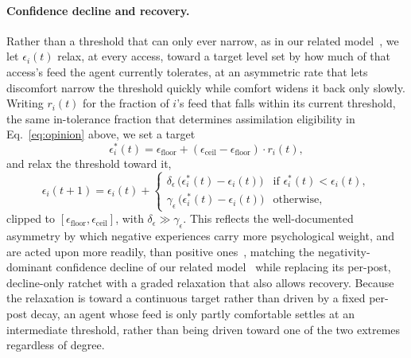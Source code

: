 \documentclass{svproc}
\begin{document}
\paragraph{Confidence decline and recovery.} Rather than a threshold that can only ever narrow, as in our related model~\cite{takeda2026backfire}, we let $\epsilon_i(t)$ relax, at every access, toward a target level set by how much of that access's feed the agent currently tolerates, at an asymmetric rate that lets discomfort narrow the threshold quickly while comfort widens it back only slowly. Writing $r_i(t)$ for the fraction of $i$'s feed that falls within its current threshold, the same in-tolerance fraction that determines assimilation eligibility in Eq.~\eqref{eq:opinion} above, we set a target
\begin{equation}
\epsilon_i^{\ast}(t) = \epsilon_{\mathrm{floor}} + (\epsilon_{\mathrm{ceil}}-\epsilon_{\mathrm{floor}})\cdot r_i(t),
\end{equation}
and relax the threshold toward it,
\begin{equation}
\epsilon_i(t{+}1) = \epsilon_i(t) +
\begin{cases}
\delta_\epsilon\,\big(\epsilon_i^{\ast}(t)-\epsilon_i(t)\big) & \text{if } \epsilon_i^{\ast}(t) < \epsilon_i(t), \\[2pt]
\gamma_\epsilon\,\big(\epsilon_i^{\ast}(t)-\epsilon_i(t)\big) & \text{otherwise},
\end{cases}
\label{eq:bc}
\end{equation}
clipped to $[\epsilon_{\mathrm{floor}},\epsilon_{\mathrm{ceil}}]$, with $\delta_\epsilon\gg\gamma_\epsilon$. This reflects the well-documented asymmetry by which negative experiences carry more psychological weight, and are acted upon more readily, than positive ones~\cite{vallone1985,baumeister2001}, matching the negativity-dominant confidence decline of our related model~\cite{takeda2026backfire} while replacing its per-post, decline-only ratchet with a graded relaxation that also allows recovery. Because the relaxation is toward a continuous target rather than driven by a fixed per-post decay, an agent whose feed is only partly comfortable settles at an intermediate threshold, rather than being driven toward one of the two extremes regardless of degree.
\end{document}
